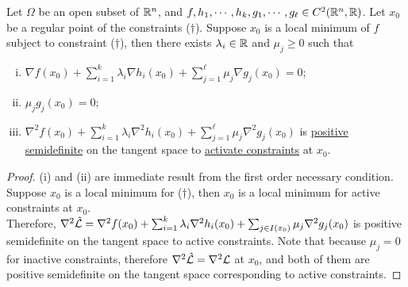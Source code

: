 \documentclass{article}
\begin{document}
	\begin{theorem}
		Let $\Omega$ be an open subset of $\mathbb{R}^n$, and $f, h_1, \cdots, h_k, g_1, \cdots, g_\ell \in C^2(\mathbb{R}^n, \mathbb{R})$. Let $x_0$ be a regular point of the constraints ($\dag$).
		Suppose $x_0$ is a local minimum of $f$ subject to constraint ($\dag$), then there exists $\lambda_i \in \mathbb{R}$ and $\mu_j \geq 0$ such that
		\begin{enumerate}[(i)]
			\item $\nabla f(x_0) + \sum_{i=1}^k \lambda_i \nabla h_i(x_0) + \sum_{j=1}^\ell \mu_j \nabla g_j(x_0) = 0$;
			\item $\mu_j g_j(x_0) = 0$;
			\item $\nabla^2 f(x_0) + \sum_{i=1}^k \lambda_i \nabla^2 h_i(x_0) + \sum_{j=1}^\ell \mu_j \nabla^2 g_j(x_0)$ is \ul{positive semidefinite} on the tangent space to \ul{activate constraints} at $x_0$.
		\end{enumerate}
	\end{theorem}
	\begin{proof}
		(i) and (ii) are immediate result from the first order necessary condition. \\
		Suppose $x_0$ is a local minimum for ($\dag$), then $x_0$ is a local minimum for active constraints at $x_0$. \\
		Therefore, $\nabla^2 \hat{\mathcal{{L}}} = \nabla^2 f(x_0) + \sum_{i=1}^k \lambda_i \nabla^2 h_i(x_0) + \sum_{j \in I(x_0)} \mu_j \nabla^2 g_j(x_0)$ is positive semidefinite on the tangent space to active constraints. Note that because $\mu_j = 0$ for inactive constraints, therefore $\nabla^2 \hat{\mathcal{{L}}} = \nabla^2 \mathcal{{L}}$ at $x_0$, and both of them are positive semidefinite on the tangent space corresponding to active constraints.
	\end{proof}
	
\end{document}
